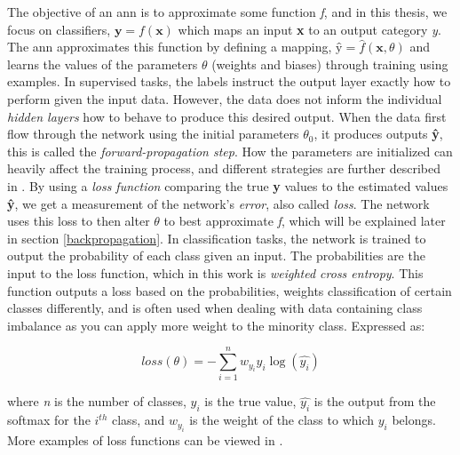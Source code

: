     The objective of an \gls{ann} is to approximate some function \textit{f}, and in this thesis, we focus on classifiers, $\textbf{y} = f(\textbf{x})$ which maps an input \textbf{x} to an output category \textit{y}. The \gls{ann} approximates this function by defining a mapping, $\textbf{\^{y}} = \hat{f}(\textbf{x},\theta)$ and learns the values of the parameters \textit{$\theta$} (weights and biases) through training using examples. In supervised tasks, the labels instruct the output layer exactly how to perform given the input data. However, the data does not inform the individual \textit{hidden layers} how to behave to produce this desired output. When the data first flow through the network using the initial parameters $\theta_{0}$, it produces outputs \textbf{\^{y}}, this is called the \textit{forward-propagation step}. How the parameters are initialized can heavily affect the training process, and different strategies are further described in \citeauthor{Goodfellow-et-al-2016_param_init}\cite{Goodfellow-et-al-2016_param_init}. By using a \textit{loss function} comparing the true \textbf{y} values to the estimated values \textbf{\^{y}}, we get a measurement of the network's \textit{error}, also called \textit{loss}. The network uses this loss to then alter $\theta$ to best approximate \textit{f}, which will be explained later in section \ref{backpropagation}. In classification tasks, the network is trained to output the probability of each class given an input\cite{ho2019real_weighted_cross_entropy}. The probabilities are the input to the loss function, which in this work is \textit{weighted cross entropy}. This function outputs a loss based on the probabilities, weights classification of certain classes differently, and is often used when dealing with data containing class imbalance as you can apply more weight to the minority class. Expressed as:
    
        \begin{equation} \label{cross_entropy}
            loss(\theta) = - \sum^{n}_{i=1} w_{y_{i}}y_{i}\log(\hat{y_{i}})
        \end{equation}
    
    where \textit{n} is the number of classes, $y_{i}$ is the true value, $\hat{y_{i}}$ is the output from the softmax for the $i^{th}$ class, and $w_{y_{i}}$ is the weight of the class to which $y_{i}$ belongs. More examples of loss functions can be viewed in \citeauthor{mishra2017deep}\cite{mishra2017deep}.
    


